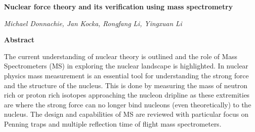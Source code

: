 \documentclass[a4paper]{article}
\begin{document}
\begin{center}
    \Huge \textbf{Nuclear force theory and its verification using mass spectrometry}
\end{center}

\vspace{-1.5em}

\begin{center}
    \emph{\large Michael Donnachie, Jan Kocka, Rongfang Li, Yingxuan Li}
\end{center}

\vspace{0.5em}

\begin{center}
    \textbf{\Large Abstract}
    \begin{adjustwidth}{1.5em}{1.5em}
        The current understanding of nuclear theory is outlined and the role of Mass Spectrometers (MS) in exploring the nuclear landscape is highlighted. In nuclear physics mass measurement is an essential tool for understanding the strong force and the structure of the nucleus. This is done by measuring the mass of neutron rich or proton rich isotopes approaching the nucleon dripline as these extremities are where the strong force can no longer bind nucleons (even theoretically) to the nucleus. The design and capabilities of MS are reviewed with particular focus on Penning traps and multiple reflection time of flight mass spectrometers.
    \end{adjustwidth}
\end{center}

\vspace{1em}

\begin{multicols}{2}

    
    
    
    
    
    
    
    \printbibliography
\end{multicols}
\end{document}
